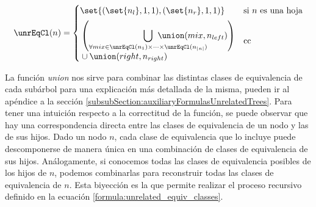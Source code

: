 \begin{align}\label{formula:unrelated_equiv_classes}
    \unrEqCl(n) = 
    \begin{cases} 
    \set{(\set{n_l}, 1, 1), (\set{n_r},1,1)} & \text{si $n$ es una hoja} \\[1ex]
    \begin{aligned}
    &\left( \bigcup_{\forall mix \in \unrEqCl(n_1) \times \dots \times \unrEqCl(n_{|n|})} \hspace{-6em} \union(mix,n_{left})\right) \\
    &\cup \union(right,n_{right})
    \end{aligned} & \text{cc}
    \end{cases}
\end{align}


La función \textit{union} nos sirve para combinar las distintas clases de equivalencia de cada subárbol para una explicación más detallada de la misma, pueden ir al apéndice a la sección \ref{subsubSection:auxiliaryFormulasUnrelatedTrees}. Para tener una intuición respecto a la correctitud de la función, se puede observar que hay una correspondencia directa entre las clases de equivalencia de un nodo y las de sus hijos. Dado un nodo $n$, cada clase de equivalencia que lo incluye puede descomponerse de manera única en una combinación de clases de equivalencia de sus hijos. Análogamente, si conocemos todas las clases de equivalencia posibles de los hijos de $n$, podemos combinarlas para reconstruir todas las clases de equivalencia de $n$. Esta biyección es la que permite realizar el proceso recursivo definido en la ecuación \ref{formula:unrelated_equiv_classes}.

